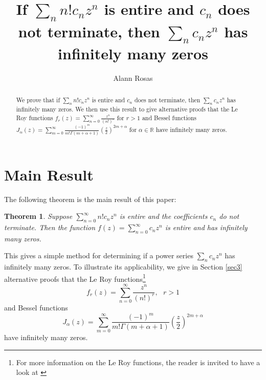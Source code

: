 \documentclass[12pt,a4paper,reqno]{amsart}
\numberwithin{equation}{section}
\theoremstyle{plain}
\newtheorem{theorem}{Theorem}[section]
\theoremstyle{definition}
\newcommand\R{\mathbb{R}}
\begin{document}
	
	\title{If $\sum_n n! c_n z^n$ is entire and $c_n$ does not terminate, then $\sum_n c_n z^n$ has infinitely many zeros}
	
	\author{Alann Rosas}
	\address{UC Irvine Department of Mathematics, Irvine, CA 92617.}
	
	
	
	\begin{abstract} We prove that if $\sum_n n! c_n z^n$ is entire and $c_n$ does not terminate, then $\sum_n c_n z^n$ has infinitely many zeros. We then use this result to give alternative proofs that the Le Roy functions $f_r(z)=\sum_{n=0}^\infty \frac{z^n}{(n!)^r}$ for $r>1$ and Bessel functions $J_\alpha(z)=\sum_{m=0}^\infty \frac{(-1)^m}{m!\Gamma(m+\alpha+1)}\left(\frac{z}{2}\right)^{2m+\alpha}$ for $\alpha\in\R$ have infinitely many zeros.
	\end{abstract}

	
	\maketitle
	
	

    \section{Main Result}
    The following theorem is the main result of this paper:
    \begin{theorem}\label{thm1.1}
        Suppose $\sum_{n=0}^\infty n!c_n z^n$ is entire and the coefficients $c_n$ do not terminate. Then the function $f(z)=\sum_{n=0}^\infty c_n z^n$ is entire and has infinitely many zeros.
    \end{theorem}
    This gives a simple method for determining if a power series $\sum_n c_n z^n$ has infinitely many zeros. To illustrate its applicability, we give in Section \ref{sec3} alternative proofs that the Le Roy functions\footnote{For more information on the Le Roy functions, the reader is invited to have a look at \cite{le-roy}}
    $$f_r(z)=\sum_{n=0}^\infty \frac{z^n}{(n!)^r},\text{ }r>1$$
    and Bessel functions
    $$J_\alpha(z)=\sum_{m=0}^\infty \frac{(-1)^m}{m!\Gamma(m+\alpha+1)}\left(\frac{z}{2}\right)^{2m+\alpha}$$
    have infinitely many zeros.
\end{document}
